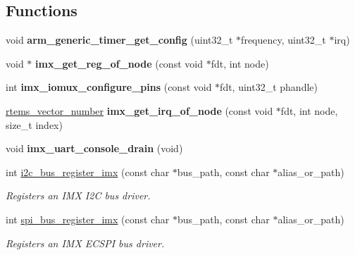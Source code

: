 \subsection*{Functions}
\begin{DoxyCompactItemize}
\item 
\mbox{\label{group__RTEMSBSPsARMimx_ga371b5f674b0ec4957ef0fee036cf6897}} 
void {\bfseries arm\+\_\+generic\+\_\+timer\+\_\+get\+\_\+config} (uint32\+\_\+t $\ast$frequency, uint32\+\_\+t $\ast$irq)
\item 
\mbox{\label{group__RTEMSBSPsARMimx_gaa1db5b1ab0e67c4ea56bc093fd855cc9}} 
void $\ast$ {\bfseries imx\+\_\+get\+\_\+reg\+\_\+of\+\_\+node} (const void $\ast$fdt, int node)
\item 
\mbox{\label{group__RTEMSBSPsARMimx_ga894b0cec4c47ce23053e57ea0360a691}} 
int {\bfseries imx\+\_\+iomux\+\_\+configure\+\_\+pins} (const void $\ast$fdt, uint32\+\_\+t phandle)
\item 
\mbox{\label{group__RTEMSBSPsARMimx_gabe0e399e72ec2edbe3fe8f367cd689da}} 
\mbox{\hyperlink{group__ClassicINTR_ga3e434c197d99f128e78cae4d9358bd8b}{rtems\+\_\+vector\+\_\+number}} {\bfseries imx\+\_\+get\+\_\+irq\+\_\+of\+\_\+node} (const void $\ast$fdt, int node, size\+\_\+t index)
\item 
\mbox{\label{group__RTEMSBSPsARMimx_ga4f388e149babd1e422541d49fef234a7}} 
void {\bfseries imx\+\_\+uart\+\_\+console\+\_\+drain} (void)
\item 
int \mbox{\hyperlink{group__RTEMSBSPsARMimx_gaf79daa85e2800cdf3336db338c205074}{i2c\+\_\+bus\+\_\+register\+\_\+imx}} (const char $\ast$bus\+\_\+path, const char $\ast$alias\+\_\+or\+\_\+path)
\begin{DoxyCompactList}\small\item\em Registers an I\+MX I2C bus driver. \end{DoxyCompactList}\item 
int \mbox{\hyperlink{group__RTEMSBSPsARMimx_ga76c0c74170b6f591738da72382b35dde}{spi\+\_\+bus\+\_\+register\+\_\+imx}} (const char $\ast$bus\+\_\+path, const char $\ast$alias\+\_\+or\+\_\+path)
\begin{DoxyCompactList}\small\item\em Registers an I\+MX E\+C\+S\+PI bus driver. \end{DoxyCompactList}\end{DoxyCompactItemize}
